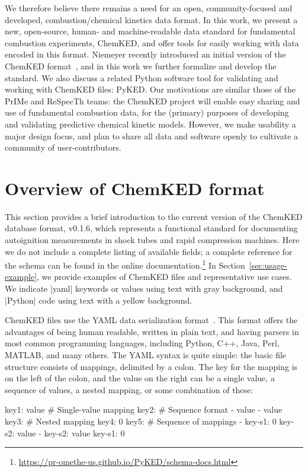 \documentclass[12pt]{ijck}
\newcommand\ck{ChemKED}
\newcommand\pk{PyKED}
\begin{document}
We therefore believe there remains a need for an open, community-focused and
developed, combustion\slash chemical kinetics data format. In this work, we
present a new, open-source, human- and machine-readable data standard for
fundamental combustion experiments, \ck{}, and offer tools for easily working
with data encoded in this format. Niemeyer recently introduced an initial
version of the \ck{} format~\autocite{Niemeyer:2016wf}, and in this work we
further formalize and develop the standard. We also discuss a related Python
software tool for validating and working with \ck{} files: \pk{}. Our
motivations are similar those of the PrIMe and ReSpecTh teams: the \ck{} project
will enable easy sharing and use of fundamental combustion data, for the
(primary) purposes of developing and validating predictive chemical kinetic
models. However, we make usability a major design focus, and plan to share all
data and software openly to cultivate a community of user-contributors.

\section{Overview of ChemKED format}\label{sec:overview-of-format}

This section provides a brief introduction to the current version of the
\ck{} database format, v0.1.6, which represents a functional standard
for documenting autoignition measurements in shock tubes and rapid compression machines.
Here we do not include a complete listing of available fields; a complete reference for the
schema can be found in the online
documentation.\footnote{\url{https://pr-omethe-us.github.io/PyKED/schema-docs.html}}
In Section~\ref{sec:usage-example}, we provide examples of \ck{} files and
representative use cases. We indicate \yabox|yaml| keywords or values using text with
gray background, and \pybox|Python| code using text with a yellow background.

\ck{} files use the YAML data serialization format~\autocite{yaml:1.2}. This
format offers the advantages of being human readable, written in plain text, and
having parsers in most common programming languages, including Python, C++, Java,
Perl, MATLAB, and many others. The YAML syntax is quite simple: the basic file
structure consists of mappings, delimited by a colon. The key for the mapping is
on the left of the colon, and the value on the right can be a single value,
a sequence of values, a nested mapping, or some combination of these:
%
\begin{yamlbox}
key1: value  # Single-value mapping
key2:  # Sequence format
  - value
  - value
key3:  # Nested mapping
  key4: 0
key5:  # Sequence of mappings
  - key-s1: 0
    key-s2: value
  - key-s2: value
    key-s1: 0
\end{yamlbox}
\end{document}
